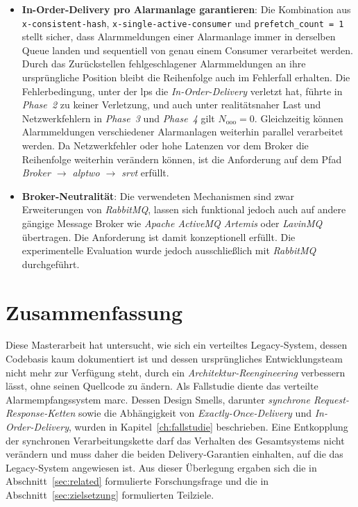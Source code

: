\begin{itemize}
    \item \textbf{In-Order-Delivery pro Alarmanlage garantieren}: Die Kombination aus \texttt{x-consistent-hash}, \texttt{x-single-active-\allowbreak consumer} und \texttt{prefetch\_\allowbreak count = 1} stellt sicher, dass Alarmmeldungen einer Alarmanlage immer in derselben Queue landen und sequentiell von genau einem Consumer verarbeitet werden. Durch das Zurückstellen fehlgeschlagener Alarmmeldungen an ihre ursprüngliche Position bleibt die Reihenfolge auch im Fehlerfall erhalten. Die Fehlerbedingung, unter der \gls{lps} die \textit{In-Order-Delivery} verletzt hat, führte in \textit{Phase~2} zu keiner Verletzung, und auch unter realitätsnaher Last und Netzwerkfehlern in \textit{Phase~3} und \textit{Phase~4} gilt $N_{\text{ooo}} = 0$. Gleichzeitig können Alarmmeldungen verschiedener Alarmanlagen weiterhin parallel verarbeitet werden. Da Netzwerkfehler oder hohe Latenzen vor dem Broker die Reihenfolge weiterhin verändern können, ist die Anforderung auf dem Pfad \textit{Broker $\rightarrow$ \gls{alptwo} $\rightarrow$ \gls{srvt}} erfüllt.

    \item \textbf{Broker-Neutralität}: Die verwendeten Mechanismen sind zwar Erweiterungen von \textit{RabbitMQ}, lassen sich funktional jedoch auch auf andere gängige Message Broker wie \textit{Apache ActiveMQ Artemis} oder \textit{LavinMQ} übertragen. Die Anforderung ist damit konzeptionell erfüllt. Die experimentelle Evaluation wurde jedoch ausschließlich mit \textit{RabbitMQ} durchgeführt.
\end{itemize}

\newpage

\section{Zusammenfassung}
\label{sec:fazit-zusammenfassung}

Diese Masterarbeit hat untersucht, wie sich ein verteiltes Legacy-System, dessen Codebasis kaum dokumentiert ist und dessen ursprüngliches Entwicklungsteam nicht mehr zur Verfügung steht, durch ein \textit{Architektur-Reengineering} verbessern lässt, ohne seinen Quellcode zu ändern. Als Fallstudie diente das verteilte Alarmempfangssystem \gls{marc}. Dessen Design Smells, darunter \textit{synchrone Request-Response-Ketten} sowie die Abhängigkeit von \textit{Exactly-Once-Delivery} und \textit{In-Order-Delivery}, wurden in Kapitel~\ref{ch:fallstudie} beschrieben. Eine Entkopplung der synchronen Verarbeitungskette darf das Verhalten des Gesamtsystems nicht verändern und muss daher die beiden Delivery-Garantien einhalten, auf die das Legacy-System angewiesen ist. Aus dieser Überlegung ergaben sich die in Abschnitt~\ref{sec:related} formulierte Forschungsfrage und die in Abschnitt~\ref{sec:zielsetzung} formulierten Teilziele.

